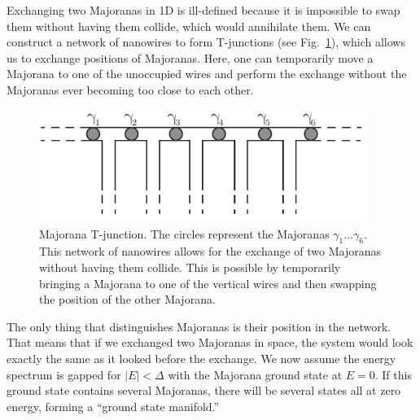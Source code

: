 Exchanging two Majoranas in 1D is ill-defined because it is impossible to swap them without having them collide, which would annihilate them.
We can construct a network of nanowires to form T-junctions (see Fig.~\ref{fig:Majorana-T-junction}), which allows us to exchange positions of Majoranas.
Here, one can temporarily move a Majorana to one of the unoccupied wires and perform the exchange without the Majoranas ever becoming too close to each other.
\begin{figure}
\begin{center}
\includegraphics[width=0.95\textwidth]{chapter_introduction/figures/T-junction-network.pdf}
\centering{}
\caption{Majorana T-junction.
The circles represent the Majoranas $\gamma_{1}...\gamma_{6}$.
This network of nanowires allows for the exchange of two Majoranas without having them collide.
This is possible by temporarily bringing a Majorana to one of the
vertical wires and then swapping the position of the other Majorana.
\label{fig:Majorana-T-junction}}
\end{center}
\end{figure}
The only thing that distinguishes Majoranas is their position in the network.
That means that if we exchanged two Majoranas in space, the system would look exactly the same as it looked before the exchange.
We now assume the energy spectrum is gapped for $|E|<\Delta$ with the Majorana ground state at $E=0$.
If this ground state contains several Majoranas, there will be several states all at zero energy, forming a  ``ground state manifold.''


